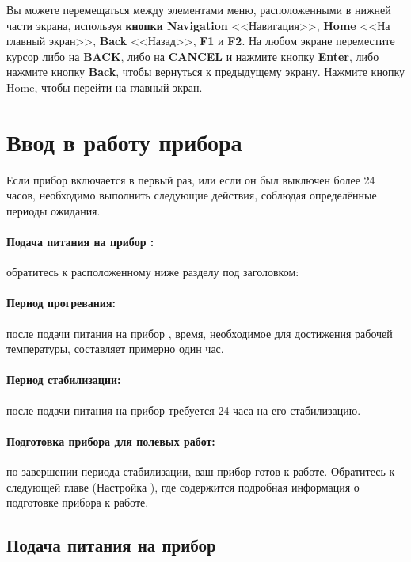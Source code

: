Вы можете перемещаться между элементами меню, расположенными в нижней части
экрана, используя \textbf{кнопки Navigation} <<Навигация>>, \textbf{Home} <<На
главный экран>>, \textbf{Back} <<Назад>>, \textbf{F1} и \textbf{F2}. На любом
экране переместите курсор либо на \textbf{BACK}, либо на \textbf{CANCEL} и
нажмите кнопку \textbf{Enter}, либо нажмите кнопку \textbf{Back}, чтобы
вернуться к предыдущему экрану. Нажмите кнопку Home, чтобы перейти на главный
экран.

\section[Ввод в работу]{Ввод в работу прибора \cg{}}

Если прибор \cg{} включается в первый раз, или если он
был выключен более 24 часов, необходимо выполнить следующие действия, соблюдая
определённые периоды ожидания.

\paragraph[Подача питания]{Подача питания на прибор \cg{}:} обратитесь к расположенному ниже
разделу под заголовком: 

\paragraph{Период прогревания:} после подачи питания на прибор \cg{}{}, время,
необходимое для достижения рабочей температуры, составляет примерно один час.

\paragraph{Период стабилизации:} после подачи питания на прибор требуется 24
часа на его стабилизацию.

\paragraph{Подготовка прибора для полевых работ:} по завершении периода
стабилизации, ваш прибор \cg{} готов к работе.
Обратитесь к следующей главе (Настройка \cg{}), где
содержится подробная информация о подготовке прибора к работе.

\subsection[Подача питания]{Подача питания на прибор \cg{}}
\label{subsec:powering_up_the_cg6_autograv}

